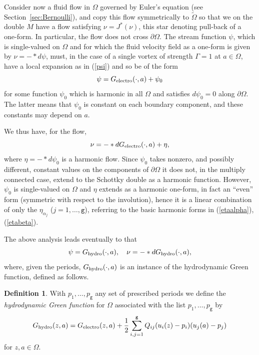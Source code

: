 \documentclass[reqno,12pt]{article}
\theoremstyle{plain}
\theoremstyle{definition}
\newtheorem{definition}{Definition}[section]
\numberwithin{equation}{section}
\numberwithin{figure}{section}
\begin{document}
Consider now a fluid flow in $\Omega$ governed by Euler's equation (see Section~\ref{sec:Bernoulli}),
and copy this flow symmetrically to $\tilde{\Omega}$ so that we on the double $M$ have a flow
satisfying $\nu=J^* (\nu)$, this star denoting pull-back of a one-form. In particular, the flow does not cross $\partial\Omega$.
The stream function $\psi$, which is single-valued on $\Omega$ and 
for which the fluid velocity field as a one-form is given by $\nu=-*d\psi$,
must, in the case of a single vortex of strength $\Gamma=1$ at $a\in\Omega$, have a local expansion as in 
(\ref{psi}) and so be of the form 
$$
\psi=G_{\rm electro}(\cdot,a)+\psi_0
$$
for some function $\psi_0$ which is harmonic in all $\Omega$ and satisfies $d\psi_0=0$ along $\partial \Omega$. The latter means
that $\psi_0$ is constant on each boundary component, and these constants may depend on $a$. 

We thus have, for the flow, 
$$
\nu=-*dG_{\rm electro}(\cdot,a)+\eta,
$$
where $\eta=-*d\psi_0$ is a harmonic flow. 
Since $\psi_0$ takes nonzero, and possibly different, constant values on the components of 
$\partial\Omega$ it does not, in the multiply connected case,
extend to the  Schottky double as a harmonic function. However, $\psi_0$ is single-valued
on $\Omega$ and $\eta$ extends as a harmonic one-form, in fact an ``even'' form (symmetric
with respect to the involution), hence it is a linear combination of only the $\eta_{\alpha_j}$ ($j=1,\dots, \texttt{g}$),
referring to the basic harmonic forms in (\ref{etaalpha}), (\ref{etabeta}).

The above analysis leads eventually to that
$$
\psi=G_{\rm hydro}(\cdot,a), \quad\nu=-*dG_{\rm hydro}(\cdot,a),
$$
where, given the periods, $G_{\rm hydro}(\cdot,a)$ is an instance of the hydrodynamic Green function,
defined as follows.
\begin{definition}
With $p_1,\dots,p_\texttt{g}$ any set of prescribed periods
we define the {\it hydrodynamic Green function} for $\Omega$ associated with the list $p_1, \dots, p_{\texttt{g}}$ by
\begin{equation}\label{Ghydrodef}
G_{\rm hydro}(z,a)
=G_{\rm electro} (z,a)+\frac{1}{2}\sum_{i,j=1}^{\texttt g}Q_{ij}(u_{i}(z)-p_i)(u_{j}(a)-p_j) 
\end{equation}
for $z,a\in\Omega$.
\end{definition} 
\end{document}
